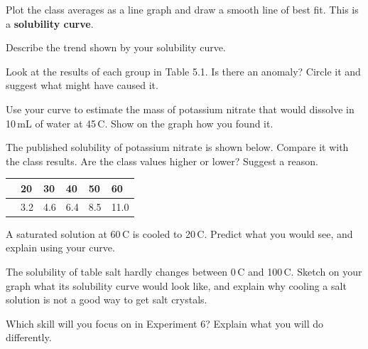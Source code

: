 \task Plot the class averages as a line graph and draw a smooth line of best fit. This is a \textbf{solubility curve}. 
\graphgrid{10cm}


\task Describe the trend shown by your solubility curve. 
\answerbox{4cm}

\task Look at the results of each group in Table 5.1. Is there an anomaly? Circle it and suggest what might have caused it. 
\answerbox{4cm}

\task Use your curve to estimate the mass of potassium nitrate that would dissolve in 10\,mL of water at 45\,\textdegree C. Show on the graph how you found it.
\answerbox{2cm}

\task The published solubility of potassium nitrate is shown below. Compare it with the class results. Are the class values higher or lower? Suggest a reason. 
\begin{ctab}
\begin{tabular}{|L{5.4cm}|C{1.6cm}|C{1.6cm}|C{1.6cm}|C{1.6cm}|C{1.6cm}|}
  \hline{} & 20 & 30 & 40 & 50 & 60 \\ \hline
   & 3.2 & 4.6 & 6.4 & 8.5 & 11.0 \\ \hline
\end{tabular}
\end{ctab}
\answerbox{4cm}

\task A saturated solution at 60\,\textdegree C is cooled to 20\,\textdegree C. Predict what you would see, and explain using your curve.
\answerbox{4cm}

\begin{yr8box}
\begin{keepext}
\exttask The solubility of table salt hardly changes between 0\,\textdegree C and 100\,\textdegree C. Sketch on your graph what its solubility curve would look like, and explain why cooling a salt solution is not a good way to get salt crystals.
\answerbox{5cm}
\end{keepext}
\end{yr8box}


\begin{skillcheck}
\end{skillcheck}

\task Which skill will you focus on in Experiment 6? Explain what you will do differently.
\answerbox{5cm}
